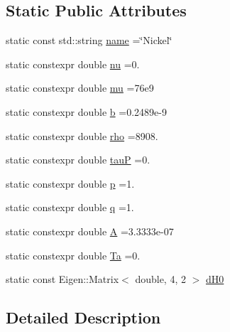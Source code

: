 \subsection*{Static Public Attributes}
\begin{DoxyCompactItemize}
\item 
static const std\+::string \hyperlink{structmodel_1_1_periodic_element_3_0128_00_01_isotropic_01_4_acf25c57f664e8fa8f5170698d2d8f50a}{name} =\char`\"{}Nickel\char`\"{}
\item 
static constexpr double \hyperlink{structmodel_1_1_periodic_element_3_0128_00_01_isotropic_01_4_ad8e88bbd40a04c819c18d7a0463f3981}{nu} =0.
\item 
static constexpr double \hyperlink{structmodel_1_1_periodic_element_3_0128_00_01_isotropic_01_4_aaa03f309cce74500979a318c0b04d7f2}{mu} =76e9
\item 
static constexpr double \hyperlink{structmodel_1_1_periodic_element_3_0128_00_01_isotropic_01_4_a6329c74eb8319fb49ce1e8433127e3b1}{b} =0.\+2489e-\/9
\item 
static constexpr double \hyperlink{structmodel_1_1_periodic_element_3_0128_00_01_isotropic_01_4_a67bf117acc478f1dba6711457b360782}{rho} =8908.
\item 
static constexpr double \hyperlink{structmodel_1_1_periodic_element_3_0128_00_01_isotropic_01_4_a6ad4c135405335fa7c154c83b78aee82}{tau\+P} =0.
\item 
static constexpr double \hyperlink{structmodel_1_1_periodic_element_3_0128_00_01_isotropic_01_4_a0f8924da09ce822c66238e3fefb57297}{p} =1.
\item 
static constexpr double \hyperlink{structmodel_1_1_periodic_element_3_0128_00_01_isotropic_01_4_a44287166c366722ee57e9186992d9d78}{q} =1.
\item 
static constexpr double \hyperlink{structmodel_1_1_periodic_element_3_0128_00_01_isotropic_01_4_a0fdaa3f42d96f8e8058a8cd148d16d56}{A} =3.\+3333e-\/07
\item 
static constexpr double \hyperlink{structmodel_1_1_periodic_element_3_0128_00_01_isotropic_01_4_aa44bc4e6fbb8042a2460d5c4753461c7}{Ta} =0.
\item 
static const Eigen\+::\+Matrix$<$ double, 4, 2 $>$ \hyperlink{structmodel_1_1_periodic_element_3_0128_00_01_isotropic_01_4_ab09436c24936ea92ccda9c38d977074a}{d\+H0}
\end{DoxyCompactItemize}


\subsection{Detailed Description}
